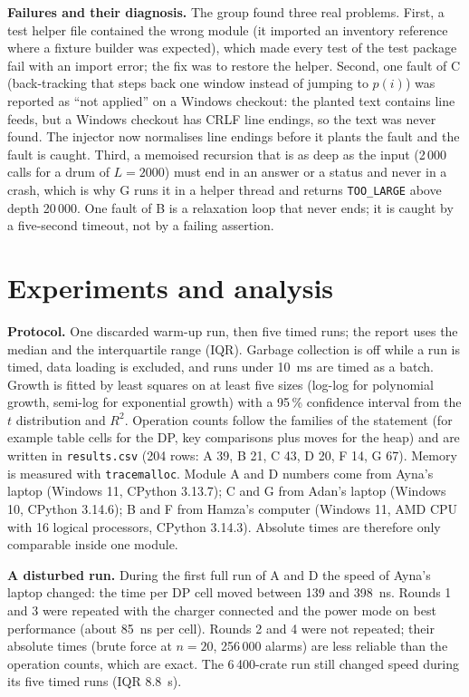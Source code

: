 \documentclass[11pt,a4paper]{article}
\newcommand{\cs}[1]{\texttt{#1}}
\begin{document}
\textbf{Failures and their diagnosis.} The group found three real problems. First, a test helper file contained the wrong module (it imported an inventory reference where a fixture builder was expected), which made every test of the test package fail with an
import error; the fix was to restore the helper. Second, one fault of C (back-tracking that steps back one window instead of jumping to $p(i)$) was reported as ``not applied'' on a Windows checkout: the planted text contains line feeds, but a Windows checkout has CRLF line endings,
so the text was never found. The injector now normalises line endings before it plants the fault and the fault is caught. Third, a memoised recursion that is as deep as the input (2\,000 calls for a drum of $L=2000$) must end in an answer or a status and never in a crash, which is why G runs it in a helper thread and returns \cs{TOO\_LARGE} above depth 20\,000.
One fault of B is a relaxation loop that never ends; it is caught by a five-second timeout, not by a failing assertion.

\section{Experiments and analysis}\label{sec:exp}
\textbf{Protocol.} One discarded warm-up run, then five timed runs; the report uses the median and the interquartile range (IQR). Garbage collection is off while a run is timed, data loading is excluded, and runs under 10~ms are timed as a batch.
Growth is fitted by least squares on at least five sizes (log-log for polynomial growth, semi-log for exponential growth) with a 95\,\% confidence interval from the $t$ distribution and $R^2$. Operation counts follow the families of the statement
(for example table cells for the DP, key comparisons plus moves for the heap) and are written in \cs{results.csv} (204 rows: A 39, B 21, C 43, D 20, F 14, G 67). Memory is measured with \cs{tracemalloc}.
Module A and D numbers come from Ayna's laptop (Windows 11, CPython 3.13.7); C and G from Adan's laptop (Windows 10, CPython 3.14.6); B and F from Hamza's computer (Windows 11, AMD CPU with 16 logical processors, CPython 3.14.3). Absolute times are therefore only comparable inside one module.

\textbf{A disturbed run.} During the first full run of A and D the speed of Ayna's laptop changed: the time per DP cell moved between 139 and 398~ns. Rounds 1 and 3 were repeated with the charger connected and the power mode on best performance (about 85~ns per cell).
Rounds 2 and 4 were not repeated; their absolute times (brute force at $n=20$, 256\,000 alarms) are less reliable than the operation counts, which are exact. The 6\,400-crate run still changed speed during its five timed runs (IQR 8.8~s).
\end{document}
